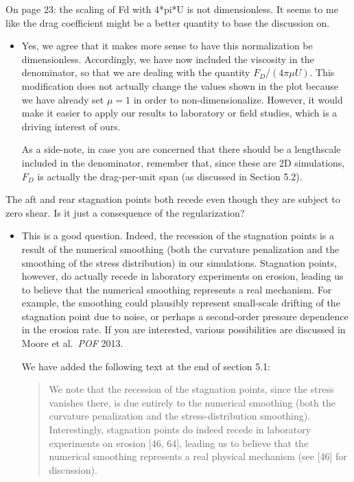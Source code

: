 \documentclass[11pt]{article}
\newcommand{\comment}[1]{{\color{blue} #1}}
\begin{document}
\noindent
\comment{On page 23: the scaling of Fd with 4*pi*U is not dimensionless.
It seems to me like the drag coefficient might be a better quantity to
base the discussion on.}
\begin{itemize}
\item Yes, we agree that it makes more sense to have this normalization be dimensionless.  Accordingly, we have now included the viscosity in the denominator, so that we are dealing with the quantity $F_D /(4 \pi \mu U)$. This modification does not actually change the values shown in the plot because we have already set $\mu =1$ in order to non-dimensionalize. However, it would make it easier to apply our results to laboratory or field studies, which is a driving interest of ours.

As a side-note, in case you are concerned that there should be a lengthscale included in the denominator, remember that, since these are 2D simulations, $F_D$ is actually the drag-per-unit span (as discussed in Section 5.2).
\end{itemize}

\noindent
\comment{The aft and rear stagnation points both recede even though they
are subject to zero shear. Is it just a consequence of the
regularization?}
\begin{itemize}
\item
This is a good question. Indeed, the recession of the stagnation points is a result of the numerical smoothing (both the curvature penalization and the smoothing of the stress distribution) in our simulations. Stagnation points, however, do actually recede in laboratory experiments on erosion, leading us to believe that the numerical smoothing represents a real mechanism. For example, the smoothing could plausibly represent small-scale drifting of the stagnation point due to noise, or perhaps a second-order pressure dependence in the erosion rate. If you are interested, various possibilities are discussed in Moore et al.~{\it POF} 2013.

We have added the following text at the end of section 5.1:
\begin{quotation}
We note that the recession of the stagnation points, since the stress
vanishes there, is due entirely to the numerical smoothing (both the
curvature penalization and the stress-distribution smoothing).
Interestingly, stagnation points do indeed recede in laboratory
experiments on erosion [46, 64], leading us to believe that the
numerical smoothing represents a real physical mechanism (see [46] for
discussion).
%
\end{quotation}

\end{itemize}
\end{document}
